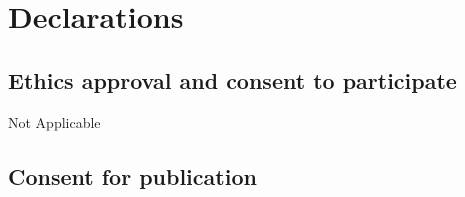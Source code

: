 \documentclass{bmcart}
\begin{document}

\section*{Declarations}

  \subsection*{Ethics approval and consent to participate}

    Not Applicable
    
  \subsection*{Consent for publication}
\end{document}
